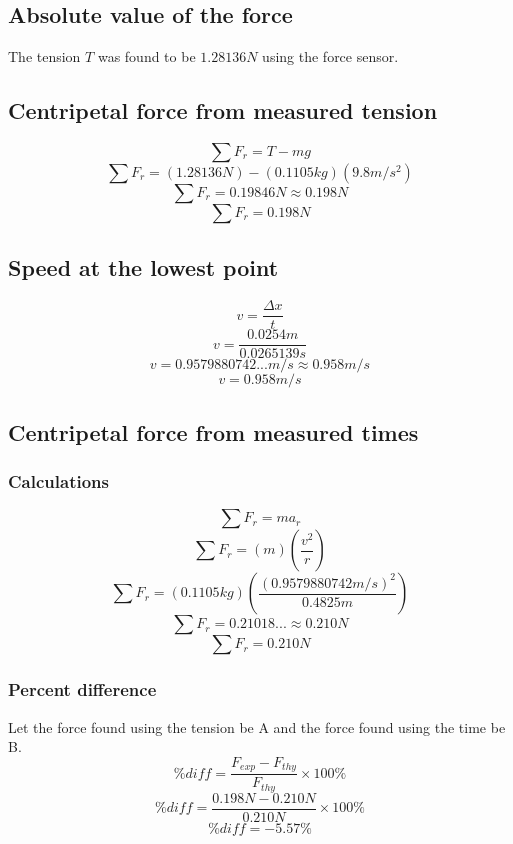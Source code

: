 \documentclass[11pt, letterpaper, includehead]{article}
\begin{document}
\subsection{Absolute value of the force}
The tension $T$ was found to be $1.28136N$ using the force sensor.

\subsection{Centripetal force from measured tension}
\begin{center}
\end{center}
$$\sum F_r = T - mg$$
$$\sum F_r = (1.28136N) - (0.1105 kg)(9.8 m/s^2)$$
$$\sum F_r = 0.19846N \approx 0.198N$$
$$\boxed{\sum F_r = 0.198N}$$

\subsection{Speed at the lowest point}


$$v = \frac{\Delta x}{t}$$
$$v = \frac{0.0254 m}{0.0265139s}$$
$$v = 0.9579880742...m/s \approx 0.958 m/s$$
$$\boxed{v = 0.958 m/s}$$

\subsection{Centripetal force from measured times}
\subsubsection{Calculations}
$$\sum F_r = ma_r$$
$$\sum F_r = (m)\left( \frac{v^2}{r}\right)$$
$$\sum F_r = (0.1105 kg)\left( \frac{(0.9579880742m/s)^2}{0.4825 m}\right)$$
$$\sum F_r = 0.21018...\approx 0.210N$$
$$\boxed{\sum F_r = 0.210N}$$

\subsubsection{Percent difference}
Let the force found using the tension be A and the force found using the time be B.
$$\%diff = \frac{F_{exp} - F_{thy}}{F_{thy}}\times 100\%$$
$$\%diff = \frac{0.198N - 0.210N}{0.210N}\times100\%$$
$$\%diff = -5.57\%$$
\end{document}
